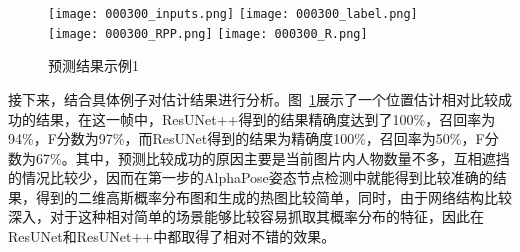 \begin{figure}[H]
    \centering
      {\texttt{[image: 000300\_inputs.png]}}
      {\texttt{[image: 000300\_label.png]}}
      {\texttt{[image: 000300\_RPP.png]}}
      {\texttt{[image: 000300\_R.png]}}
    \caption{预测结果示例1}
    \label{success}
\end{figure}
接下来，结合具体例子对估计结果进行分析。图~\ref{success}展示了一个位置估计相对比较成功的结果，在这一帧中，ResUNet++得到的结果精确度达到了100\%，召回率为94\%，F分数为97\%，而ResUNet得到的结果为精确度100\%，召回率为50\%，F分数为67\%。其中，预测比较成功的原因主要是当前图片内人物数量不多，互相遮挡的情况比较少，因而在第一步的AlphaPose姿态节点检测中就能得到比较准确的结果，得到的二维高斯概率分布图和生成的热图比较简单，同时，由于网络结构比较深入，对于这种相对简单的场景能够比较容易抓取其概率分布的特征，因此在ResUNet和ResUNet++中都取得了相对不错的效果。

